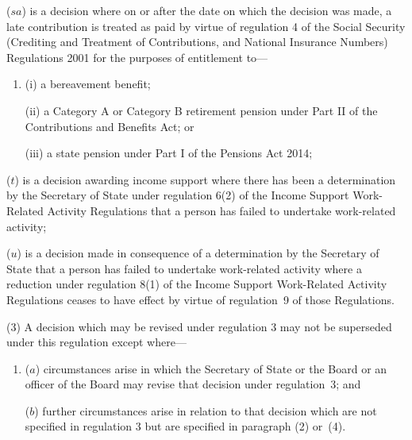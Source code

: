 \documentclass[12pt,a4paper]{article}
\begin{document}
\begin{enumerate}
($sa$) is a decision where on or after the date on which the decision was made, a late contribution is treated as paid by virtue of regulation 4 of the Social Security (Crediting and Treatment of Contributions, and National Insurance Numbers) Regulations 2001 for the purposes of entitlement to—
\begin{enumerate}\item[]
(i) a bereavement benefit;

(ii) a Category A or Category B retirement pension under Part II of the Contributions and Benefits Act; or

(iii) a state pension under Part I of the Pensions Act 2014;
\end{enumerate}

($t$) is a decision awarding income support where there has been a determination by the Secretary of State under regulation 6(2) of the Income Support Work-Related Activity Regulations that a person has failed to undertake work-related activity;

($u$) is a decision made in consequence of a determination by the Secretary of State that a person has failed to undertake work-related activity where a reduction under regulation 8(1) of the Income Support Work-Related Activity Regulations ceases to have effect by virtue of regulation~9 of those Regulations.
\end{enumerate}

(3) A decision which may be revised under regulation 3 may not be superseded under this regulation except where—
\begin{enumerate}\item[]
($a$) circumstances arise in which the Secretary of State 
or the Board or an officer of the Board  %
may revise that decision under regulation~3; and

($b$) further circumstances arise in relation to that decision which are not specified in regulation 3 but are specified in paragraph (2) or~(4).
\end{enumerate}
\end{document}
